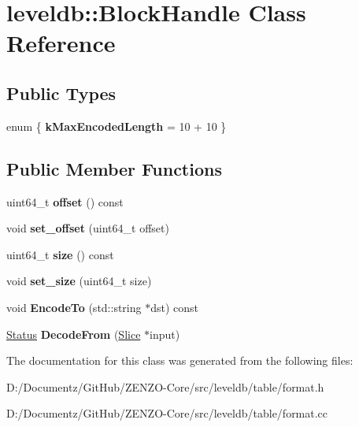\hypertarget{classleveldb_1_1_block_handle}{}\section{leveldb\+::Block\+Handle Class Reference}
\label{classleveldb_1_1_block_handle}
\subsection*{Public Types}
\begin{DoxyCompactItemize}
\item 
\mbox{\label{classleveldb_1_1_block_handle_a63d4b12a32c670d18b74a2ff9451da28}} 
enum \{ {\bfseries k\+Max\+Encoded\+Length} = 10 + 10
 \}
\end{DoxyCompactItemize}
\subsection*{Public Member Functions}
\begin{DoxyCompactItemize}
\item 
\mbox{\label{classleveldb_1_1_block_handle_adb071cded811275424d2cf33757d42e5}} 
uint64\+\_\+t {\bfseries offset} () const
\item 
\mbox{\label{classleveldb_1_1_block_handle_ae6dad857a4f7f5e051762f874f0050bc}} 
void {\bfseries set\+\_\+offset} (uint64\+\_\+t offset)
\item 
\mbox{\label{classleveldb_1_1_block_handle_a82b79636d23162c441fb33b71849371d}} 
uint64\+\_\+t {\bfseries size} () const
\item 
\mbox{\label{classleveldb_1_1_block_handle_a47a4169dce3026122b76d594453b78a8}} 
void {\bfseries set\+\_\+size} (uint64\+\_\+t size)
\item 
\mbox{\label{classleveldb_1_1_block_handle_aed011eeca92f0852caa106a34c3a80e6}} 
void {\bfseries Encode\+To} (std\+::string $\ast$dst) const
\item 
\mbox{\label{classleveldb_1_1_block_handle_a1660fd202984d8d5bfa4bed6c5613621}} 
\mbox{\hyperlink{classleveldb_1_1_status}{Status}} {\bfseries Decode\+From} (\mbox{\hyperlink{classleveldb_1_1_slice}{Slice}} $\ast$input)
\end{DoxyCompactItemize}


The documentation for this class was generated from the following files\+:\begin{DoxyCompactItemize}
\item 
D\+:/\+Documentz/\+Git\+Hub/\+Z\+E\+N\+Z\+O-\/\+Core/src/leveldb/table/format.\+h\item 
D\+:/\+Documentz/\+Git\+Hub/\+Z\+E\+N\+Z\+O-\/\+Core/src/leveldb/table/format.\+cc\end{DoxyCompactItemize}

